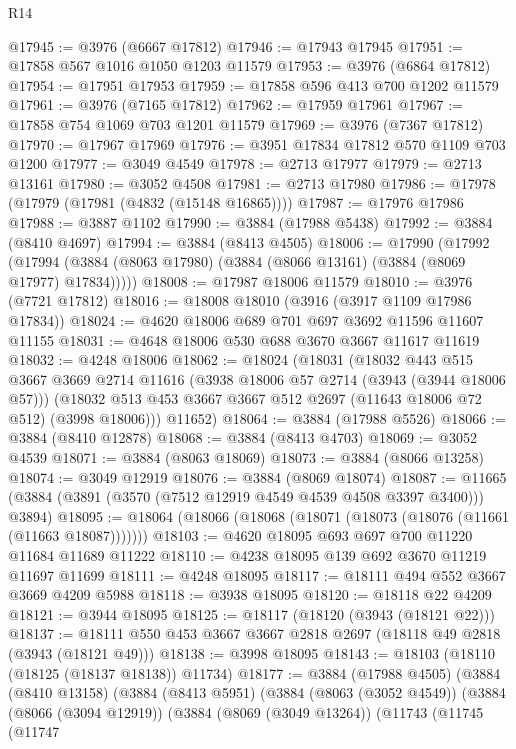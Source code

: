 \begin{lexlean}{R14}
\begin{coremodule}
@17945 := @3976 (@6667 @17812)
@17946 := @17943 @17945
@17951 := @17858 @567 @1016 @1050 @1203 @11579
@17953 := @3976 (@6864 @17812)
@17954 := @17951 @17953
@17959 := @17858 @596 @413 @700 @1202 @11579
@17961 := @3976 (@7165 @17812)
@17962 := @17959 @17961
@17967 := @17858 @754 @1069 @703 @1201 @11579
@17969 := @3976 (@7367 @17812)
@17970 := @17967 @17969
@17976 := @3951 @17834 @17812 @570 @1109 @703 @1200
@17977 := @3049 @4549
@17978 := @2713 @17977
@17979 := @2713 @13161
@17980 := @3052 @4508
@17981 := @2713 @17980
@17986 := @17978 (@17979 (@17981 (@4832 (@15148 @16865))))
@17987 := @17976 @17986
@17988 := @3887 @1102
@17990 := @3884 (@17988 @5438)
@17992 := @3884 (@8410 @4697)
@17994 := @3884 (@8413 @4505)
@18006 := @17990
    (@17992 (@17994 (@3884 (@8063 @17980) (@3884 (@8066 @13161) (@3884 (@8069 @17977) @17834)))))
@18008 := @17987 @18006 @11579
@18010 := @3976 (@7721 @17812)
@18016 := @18008 @18010 (@3916 (@3917 @1109 @17986 @17834))
@18024 := @4620 @18006 @689 @701 @697 @3692 @11596 @11607 @11155
@18031 := @4648 @18006 @530 @688 @3670 @3667 @11617 @11619
@18032 := @4248 @18006
@18062 := @18024
    (@18031
      (@18032
        @443
        @515
        @3667
        @3669
        @2714
        @11616
        (@3938 @18006 @57 @2714 (@3943 (@3944 @18006 @57)))
        (@18032 @513 @453 @3667 @3667 @512 @2697 (@11643 @18006 @72 @512) (@3998 @18006)))
      @11652)
@18064 := @3884 (@17988 @5526)
@18066 := @3884 (@8410 @12878)
@18068 := @3884 (@8413 @4703)
@18069 := @3052 @4539
@18071 := @3884 (@8063 @18069)
@18073 := @3884 (@8066 @13258)
@18074 := @3049 @12919
@18076 := @3884 (@8069 @18074)
@18087 := @11665 (@3884 (@3891 (@3570 (@7512 @12919 @4549 @4539 @4508 @3397 @3400))) @3894)
@18095 := @18064 (@18066 (@18068 (@18071 (@18073 (@18076 (@11661 (@11663 @18087)))))))
@18103 := @4620 @18095 @693 @697 @700 @11220 @11684 @11689 @11222
@18110 := @4238 @18095 @139 @692 @3670 @11219 @11697 @11699
@18111 := @4248 @18095
@18117 := @18111 @494 @552 @3667 @3669 @4209 @5988
@18118 := @3938 @18095
@18120 := @18118 @22 @4209
@18121 := @3944 @18095
@18125 := @18117 (@18120 (@3943 (@18121 @22)))
@18137 := @18111 @550 @453 @3667 @3667 @2818 @2697 (@18118 @49 @2818 (@3943 (@18121 @49)))
@18138 := @3998 @18095
@18143 := @18103 (@18110 (@18125 (@18137 @18138)) @11734)
@18177 := @3884
    (@17988 @4505)
    (@3884
      (@8410 @13158)
      (@3884
        (@8413 @5951)
        (@3884
          (@8063 (@3052 @4549))
          (@3884
            (@8066 (@3094 @12919))
            (@3884
              (@8069 (@3049 @13264))
              (@11743
                (@11745
                  (@11747

\end{coremodule}
\end{lexlean}

